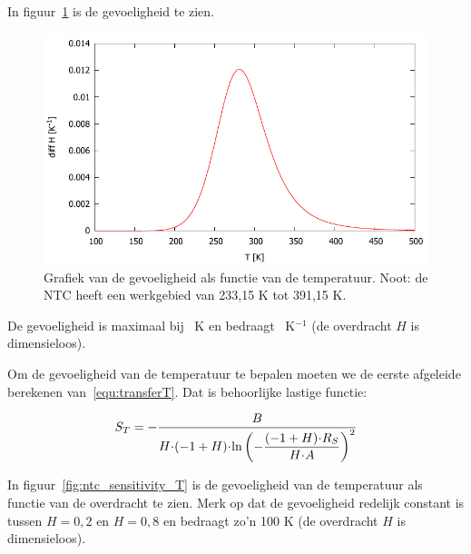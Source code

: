 \documentclass[12pt,a4paper,final,twoside,fleqn]{article}
\let\oldcdot\cdot
\renewcommand{\cdot}{\kern-.10em\oldcdot\kern-.10em}
\begin{document}
In figuur~\ref{fig:ntc_sensitivity_H} is de gevoeligheid te zien.

\begin{figure}[ht!]
\centering
\includegraphics[scale=1]{gnuplot/ntc_sensitivity_H}
\caption[Grafiek van de gevoeligheid als functie van de temperatuur]{Grafiek van de gevoeligheid als functie van de temperatuur. Noot:
de NTC heeft een werkgebied van 233,15 K tot 391,15 K.}
\label{fig:ntc_sensitivity_H}
\end{figure}


De gevoeligheid is maximaal bij \ntcsensitivityhmaxtemp\ K en bedraagt
\ntcsensitivityhmaxdiff\ K$^{-1}$ (de overdracht $H$ is dimensieloos).

Om de gevoeligheid van de temperatuur te bepalen moeten we de eerste afgeleide
berekenen van~\eqref{equ:transferT}. Dat is behoorlijke lastige functie:

\begin{equation}
S_T = -\dfrac{B}{  H\cdot(-1+H)\cdot \ln\left(-\dfrac{ (-1+H)\cdot R_S }{H\cdot A}  \right)^2 }
\end{equation}

In figuur~\ref{fig:ntc_sensitivity_T} is de gevoeligheid van de temperatuur als functie van de
overdracht te zien. Merk op dat de gevoeligheid redelijk constant is tussen $H=0,2$ en $H=0,8$
en bedraagt zo'n 100 K (de overdracht $H$ is dimensieloos).
\end{document}
